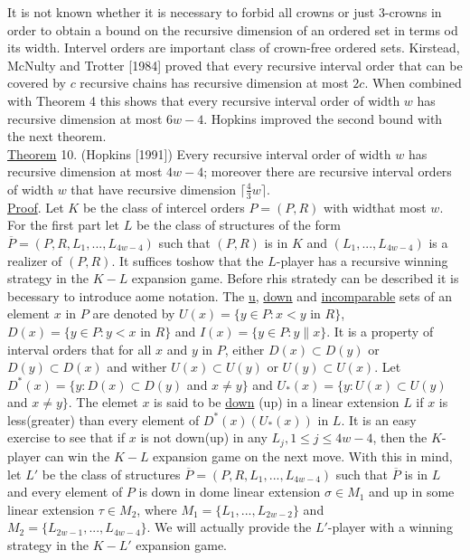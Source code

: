 \documentclass[twoside]{article}
\begin{document}
It is not known whether it is necessary to forbid all crowns or just 3-crowns in order to obtain a bound
on the recursive dimension of an ordered set in terms od its width. Intervel orders are important class of
crown-free ordered sets. Kirstead, McNulty and Trotter [1984] proved that every recursive interval order
that can be covered by $c$ recursive chains has recursive dimension at most $2c$. When combined with
Theorem 4 this shows that every recursive interval order of width $w$ has recursive dimension at most 
$6w-4$. Hopkins improved the second bound with the next theorem.\\
%
%
\newline
\underline{Theorem} 10. (Hopkins [1991]) Every recursive interval order of width $w$ has recursive dimension
at most $4w-4$; moreover there are recursive interval orders of width $w$ that have recursive dimension
$\lceil {\frac 4 3}w \rceil$.\\
\newline
\underline{Proof}. Let $K$ be the class of intercel orders $P =(P,R)$ with widthat most $w$.
For the first part let $L$ be the class of structures of the form $\overline{P}=(P,R,L_1,...,L_{4w-4})$
such that $(P,R)$ is in $K$ and $(L_1,...,L_{4w-4})$ is a realizer of $(P,R)$. It suffices toshow that the $L$-player has a recursive winning
strategy in the $K-L$ expansion game. Before rhis stratedy can be described it is becessary
to introduce aome notation. The \underline{u}, \underline{down} and \underline{incomparable}
sets of an element $x$ in $P$ are denoted by $U(x) =\{y\in P: x<y$ in $R\}$,
$D(x)=\{y \in P:y<x$ in $R\}$ and $I(x) =\{y\in P: y\parallel x\}$. It is a property of interval
orders that for all $x$ and $y$ in $P$, either $D(x) \subset D(y)$ or $D(y) \subset D(x)$
and wither $U(x) \subset U(y)$ or $U(y) \subset U(x)$. Let 
$D^*(x) = \{y: D(x) \subset D(y)$ and $ x\neq y\}$ and $U_*(x) =\{ y: U(x) \subset U(y)$ and $x \neq y\}$.
The elemet $x$ is said to be \underline{down} (up) in  a linear extension $L$ if $x$ is less(greater)
than every element of $D^*(x) (U_*(x))$ in $L$. It is an easy exercise to see that if $x$ is not down(up)
in any $L_j, 1\leq j\leq 4w-4$, then the $K$-player can win the $K-L$ expansion game on the next move.
With this in mind, let $L'$ be the class of structures $\overline{P}=(P,R,L_1,...,L_{4w-4})$ such that
$\overline{P}$ is in $L$ and every element of $P$ is down in dome linear extension $\sigma \in M_1$
and up in some linear extension $\tau \in M_2$, where $M_1 = \{L_1,...,L_{2w-2}\}$ and
$M_2 = \{L_{2w-1},...,L_{4w-4}\}$. We will actually provide the $L'$-player with a winning strategy in
the $K-L'$ expansion game.
\end{document}

